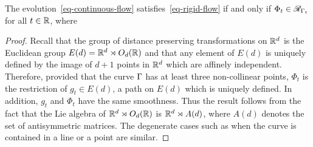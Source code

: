 \begin{prop}\label{rigid-ch}
	The evolution~\eqref{eq-continuous-flow} satisfies~\eqref{eq-rigid-flow} if and only if $\Phi_t \in \mathcal{R}_{\Gamma_t}$ for all $t \in \mathbb{R}$,  where  
\end{prop}
\begin{proof}
Recall that the group of distance preserving transformations on ${\mathbb R}^d$ is the Euclidean group $E(d) = {\mathbb R}^d \rtimes  O_d({\mathbb R})$ and that any element of $E(d)$ is uniquely defined by the image of $d+1$ points in ${\mathbb R}^d$ which are affinely independent. Therefore, provided that the curve $\Gamma$ has at least three non-collinear points, $\Phi_t$ is the restriction of $g_t \in E(d)$, a path on $E(d)$ which is uniquely defined. In addition, $g_t$ and $\Phi_t$ have the same smoothness. Thus the result follows from the fact that the Lie algebra of ${\mathbb R}^d \rtimes  O_d({\mathbb R})$ is ${\mathbb R}^d \rtimes A(d)$, where $A(d)$ denotes the set of antisymmetric matrices.
The degenerate cases such as when the curve is contained in a line or a point are similar.

\end{proof}

